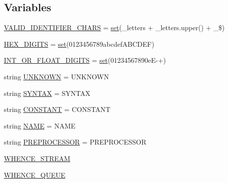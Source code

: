 \subsection*{Variables}
\begin{DoxyCompactItemize}
\item 
\hyperlink{namespacecpp_1_1tokenize_a733f1cf605b1630fb6a0a7f30aaefbec}{V\+A\+L\+I\+D\+\_\+\+I\+D\+E\+N\+T\+I\+F\+I\+E\+R\+\_\+\+C\+H\+A\+RS} = \hyperlink{vendor_2googletest_2googlemock_2CMakeLists_8txt_aa99cc432a5064db15e7653de9d85d2d2}{set}(\+\_\+letters + \+\_\+letters.\+upper() + \textquotesingle{}\+\_\$\textquotesingle{})
\item 
\hyperlink{namespacecpp_1_1tokenize_a8b45b0f0f2b504757e9ede9c342b2c36}{H\+E\+X\+\_\+\+D\+I\+G\+I\+TS} = \hyperlink{vendor_2googletest_2googlemock_2CMakeLists_8txt_aa99cc432a5064db15e7653de9d85d2d2}{set}(\textquotesingle{}0123456789abcdef\+A\+B\+C\+D\+E\+F\textquotesingle{})
\item 
\hyperlink{namespacecpp_1_1tokenize_ad8c6dd06d4e6ef2e24e9186acb0aff43}{I\+N\+T\+\_\+\+O\+R\+\_\+\+F\+L\+O\+A\+T\+\_\+\+D\+I\+G\+I\+TS} = \hyperlink{vendor_2googletest_2googlemock_2CMakeLists_8txt_aa99cc432a5064db15e7653de9d85d2d2}{set}(\textquotesingle{}01234567890e\+E-\/+\textquotesingle{})
\item 
string \hyperlink{namespacecpp_1_1tokenize_a0dfd65c08216eed29f74a64b603ac540}{U\+N\+K\+N\+O\+WN} = \textquotesingle{}U\+N\+K\+N\+O\+WN\textquotesingle{}
\item 
string \hyperlink{namespacecpp_1_1tokenize_a1655e62b60899059935930c81ba25c01}{S\+Y\+N\+T\+AX} = \textquotesingle{}S\+Y\+N\+T\+AX\textquotesingle{}
\item 
string \hyperlink{namespacecpp_1_1tokenize_a5e3bf1014a301906871113a989188a78}{C\+O\+N\+S\+T\+A\+NT} = \textquotesingle{}C\+O\+N\+S\+T\+A\+NT\textquotesingle{}
\item 
string \hyperlink{namespacecpp_1_1tokenize_aa14251ded979d72f93d7b234d8cfb584}{N\+A\+ME} = \textquotesingle{}N\+A\+ME\textquotesingle{}
\item 
string \hyperlink{namespacecpp_1_1tokenize_a3c8918ee13b9acf5ea4e70b484d67268}{P\+R\+E\+P\+R\+O\+C\+E\+S\+S\+OR} = \textquotesingle{}P\+R\+E\+P\+R\+O\+C\+E\+S\+S\+OR\textquotesingle{}
\item 
\hyperlink{namespacecpp_1_1tokenize_a8dd117207e391864f7d9cb656e826a9e}{W\+H\+E\+N\+C\+E\+\_\+\+S\+T\+R\+E\+AM}
\item 
\hyperlink{namespacecpp_1_1tokenize_ad02466a473c5e9c2ac256e18209f0967}{W\+H\+E\+N\+C\+E\+\_\+\+Q\+U\+E\+UE}
\end{DoxyCompactItemize}


